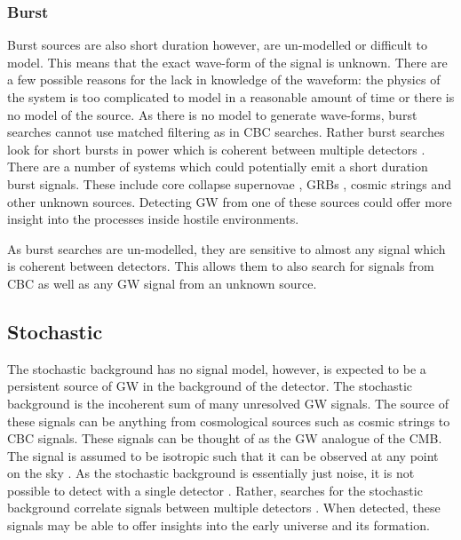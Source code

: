 \subsubsection{\label{sources:transient:burst}Burst}

Burst sources are also short duration however, are un-modelled or difficult to model.
This means that the exact wave-form of the signal is unknown.
There are a few possible reasons for the lack in knowledge of the waveform: the physics of the system is too complicated to model in a reasonable amount of time or there is no model of the source.
As there is no model to generate wave-forms, burst searches cannot use matched filtering as in \gls{CBC} searches.
Rather burst searches look for short bursts in power which is coherent between multiple detectors \citep{cornish2015BayeswaveBayesian, klimenko2008CoherentMethod}.
There are a number of systems which could potentially emit a short duration burst signals.
These include core collapse supernovae \citep{ott2008GravitationalWave}, \glspl{GRB} \citep{aasi2014SearchGravitational}, cosmic strings \citep{damour2005GravitationalRadiation} and other unknown sources.
Detecting \gls{GW} from one of these sources could offer more insight into the processes inside hostile environments.

As burst searches are un-modelled, they are sensitive to almost any signal which is coherent between detectors. 
This allows them to also search for signals from \gls{CBC} as well as any \gls{GW} signal from an unknown source.



\subsection{Stochastic}

The stochastic background has no signal model, however, is expected to be a persistent source of \gls{GW} in the background of the detector. 
The stochastic background is the incoherent sum of many unresolved \gls{GW} signals.
The source of these signals can be anything from cosmological sources such as cosmic strings to \gls{CBC} signals.
These signals can be thought of as the \gls{GW} analogue of the \gls{CMB}.
The signal is assumed to be isotropic such that it can be observed at any point on the sky \citep{christensen2018StochasticGravitational}. 
As the stochastic background is essentially just noise, it is not possible to detect with a single detector \citep{christensen2018StochasticGravitational}.
Rather, searches for the stochastic background correlate signals between multiple detectors \citep{romano2019SearchesStochastic,christensen2018StochasticGravitational}. 
When detected, these signals may be able to offer insights into the early universe and its formation.



